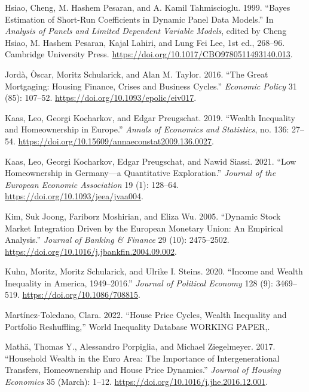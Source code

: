 \documentclass[
  a4paper,
  DIV=11,
  numbers=noendperiod]{scrartcl}
\newlength{\cslhangindent}
\newenvironment{CSLReferences}[2] %
 {\begin{list}{}{%
  \setlength{\itemindent}{0pt}
  \setlength{\leftmargin}{0pt}
  \setlength{\parsep}{0pt}
  \ifodd #1
   \setlength{\leftmargin}{\cslhangindent}
   \setlength{\itemindent}{-1\cslhangindent}
  \fi
  \setlength{\itemsep}{#2\baselineskip}}}
 {\end{list}}
\begin{document}
\begin{CSLReferences}{1}{0}
Hsiao, Cheng, M. Hashem Pesaran, and A. Kamil Tahmiscioglu. 1999.
{``Bayes Estimation of Short-Run Coefficients in Dynamic Panel Data
Models.''} In \emph{Analysis of {Panels} and {Limited Dependent Variable
Models}}, edited by Cheng Hsiao, M. Hashem Pesaran, Kajal Lahiri, and
Lung Fei Lee, 1st ed., 268--96. Cambridge University Press.
\url{https://doi.org/10.1017/CBO9780511493140.013}.

Jordà, Òscar, Moritz Schularick, and Alan M. Taylor. 2016. {``The Great
Mortgaging: Housing Finance, Crises and Business Cycles.''}
\emph{Economic Policy} 31 (85): 107--52.
\url{https://doi.org/10.1093/epolic/eiv017}.

Kaas, Leo, Georgi Kocharkov, and Edgar Preugschat. 2019. {``Wealth
{Inequality} and {Homeownership} in {Europe}.''} \emph{Annals of
Economics and Statistics}, no. 136: 27--54.
\url{https://doi.org/10.15609/annaeconstat2009.136.0027}.

Kaas, Leo, Georgi Kocharkov, Edgar Preugschat, and Nawid Siassi. 2021.
{``Low {Homeownership} in {Germany}---a {Quantitative Exploration}.''}
\emph{Journal of the European Economic Association} 19 (1): 128--64.
\url{https://doi.org/10.1093/jeea/jvaa004}.

Kim, Suk Joong, Fariborz Moshirian, and Eliza Wu. 2005. {``Dynamic Stock
Market Integration Driven by the {European Monetary Union}: {An}
Empirical Analysis.''} \emph{Journal of Banking \& Finance} 29 (10):
2475--2502. \url{https://doi.org/10.1016/j.jbankfin.2004.09.002}.

Kuhn, Moritz, Moritz Schularick, and Ulrike I. Steins. 2020. {``Income
and {Wealth Inequality} in {America}, 1949--2016.''} \emph{Journal of
Political Economy} 128 (9): 3469--519.
\url{https://doi.org/10.1086/708815}.

Martínez-Toledano, Clara. 2022. {``House {Price Cycles}, {Wealth
Inequality} and {Portfolio Reshuffling},''} World {Inequality Database
WORKING PAPER},.

Mathä, Thomas Y., Alessandro Porpiglia, and Michael Ziegelmeyer. 2017.
{``Household Wealth in the Euro Area: {The} Importance of
Intergenerational Transfers, Homeownership and House Price Dynamics.''}
\emph{Journal of Housing Economics} 35 (March): 1--12.
\url{https://doi.org/10.1016/j.jhe.2016.12.001}.


\end{CSLReferences}
\end{document}

